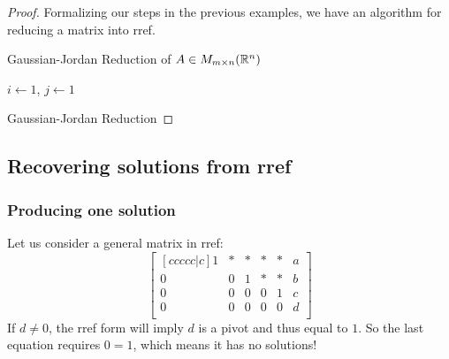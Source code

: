 \begin{proof}
	Formalizing our steps in the previous examples, we have an algorithm for reducing a matrix into rref.

	\begin{algorithm}
		\caption{Gaussian-Jordan Reduction of $A\in M_{m\times n}(\mathbb{R}^n)$}
		
			$i\gets 1$, $j\gets 1$
	\end{algorithm}
	\todo Gaussian-Jordan Reduction
\end{proof}
\subsection{Recovering solutions from rref}

\subsubsection*{Producing one solution}
Let us consider a general matrix in rref:\[
	\begin{bmatrix}[c c c c c|c]
		1& *& * &* &*& a\\
		0& 0 & 1 &* &*& b\\
		0& 0 & 0 &0 &1& c\\
		0& 0& 0 & 0 &0& d\\
	\end{bmatrix}
\]
If $d\neq0$, the rref form will imply $d$ is a pivot and thus equal to $1$.
So the last equation requires $0=1$, which means it has no solutions!

